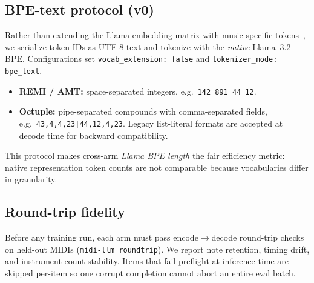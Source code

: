 \subsection{BPE-text protocol (v0)}

Rather than extending the Llama embedding matrix with music-specific tokens~\cite{wu2026midillm}, we serialize token IDs as UTF-8 text and tokenize with the \emph{native} Llama~3.2 BPE. Configurations set \texttt{vocab\_extension: false} and \texttt{tokenizer\_mode: bpe\_text}.

\begin{itemize}[leftmargin=*]
\item \textbf{REMI / AMT:} space-separated integers, e.g.\ \texttt{142 891 44 12}.
\item \textbf{Octuple:} pipe-separated compounds with comma-separated fields, e.g.\ \texttt{43,4,4,23|44,12,4,23}. Legacy list-literal formats are accepted at decode time for backward compatibility.
\end{itemize}

This protocol makes cross-arm \emph{Llama BPE length} the fair efficiency metric: native representation token counts are not comparable because vocabularies differ in granularity.

\subsection{Round-trip fidelity}

Before any training run, each arm must pass encode$\to$decode round-trip checks on held-out MIDIs (\texttt{midi-llm roundtrip}). We report note retention, timing drift, and instrument count stability. Items that fail preflight at inference time are skipped per-item so one corrupt completion cannot abort an entire eval batch.
